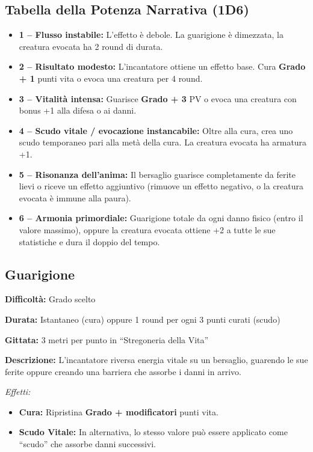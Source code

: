\documentclass[./magie.tex]{subfiles}
\begin{document}
\subsection*{Tabella della Potenza Narrativa (1D6)}
\begin{itemize}
\item \textbf{1 – Flusso instabile:} L’effetto è debole. La guarigione è dimezzata, la creatura evocata ha 2 round di durata.
\item \textbf{2 – Risultato modesto:} L’incantatore ottiene un effetto base. Cura \textbf{Grado + 1} punti vita o evoca una creatura per 4 round.
\item \textbf{3 – Vitalità intensa:} Guarisce \textbf{Grado + 3} PV o evoca una creatura con bonus +1 alla difesa o ai danni.
\item \textbf{4 – Scudo vitale / evocazione instancabile:} Oltre alla cura, crea uno scudo temporaneo pari alla metà della cura. La creatura evocata ha armatura +1.
\item \textbf{5 – Risonanza dell’anima:} Il bersaglio guarisce completamente da ferite lievi o riceve un effetto aggiuntivo (rimuove un effetto negativo, o la creatura evocata è immune alla paura).
\item \textbf{6 – Armonia primordiale:} Guarigione totale da ogni danno fisico (entro il valore massimo), oppure la creatura evocata ottiene +2 a tutte le sue statistiche e dura il doppio del tempo.
\end{itemize}

\clearpage

\subsection*{Guarigione}
\begin{description}
\item \textbf{Difficoltà:} Grado scelto
\item \textbf{Durata:} Istantaneo (cura) oppure 1 round per ogni 3 punti curati (scudo)
\item \textbf{Gittata:} 3 metri per punto in “Stregoneria della Vita”
\item \textbf{Descrizione:} L’incantatore riversa energia vitale su un bersaglio, guarendo le sue ferite oppure creando una barriera che assorbe i danni in arrivo.

\textit{Effetti:}
\begin{itemize}
  \item \textbf{Cura:} Ripristina \textbf{Grado + modificatori} punti vita.
  \item \textbf{Scudo Vitale:} In alternativa, lo stesso valore può essere applicato come “scudo” che assorbe danni successivi.
\end{itemize}
\end{description}
\end{document}
